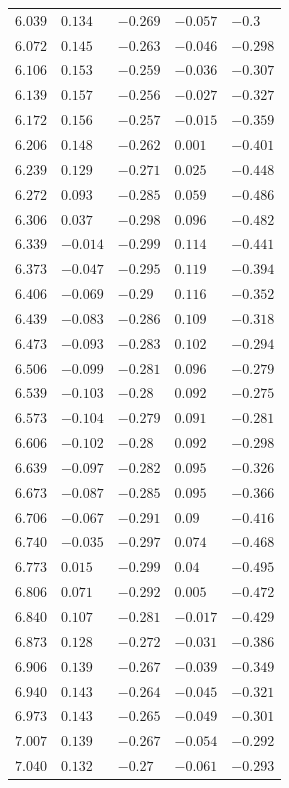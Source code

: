\begin{table}[h]
\begin{tabular}{rllll}
$6.039$&$0.134$&$-0.269$&$-0.057$&$-0.3$\\
$6.072$&$0.145$&$-0.263$&$-0.046$&$-0.298$\\
$6.106$&$0.153$&$-0.259$&$-0.036$&$-0.307$\\
$6.139$&$0.157$&$-0.256$&$-0.027$&$-0.327$\\
$6.172$&$0.156$&$-0.257$&$-0.015$&$-0.359$\\
$6.206$&$0.148$&$-0.262$&$0.001$&$-0.401$\\
$6.239$&$0.129$&$-0.271$&$0.025$&$-0.448$\\
$6.272$&$0.093$&$-0.285$&$0.059$&$-0.486$\\
$6.306$&$0.037$&$-0.298$&$0.096$&$-0.482$\\
$6.339$&$-0.014$&$-0.299$&$0.114$&$-0.441$\\
$6.373$&$-0.047$&$-0.295$&$0.119$&$-0.394$\\
$6.406$&$-0.069$&$-0.29$&$0.116$&$-0.352$\\
$6.439$&$-0.083$&$-0.286$&$0.109$&$-0.318$\\
$6.473$&$-0.093$&$-0.283$&$0.102$&$-0.294$\\
$6.506$&$-0.099$&$-0.281$&$0.096$&$-0.279$\\
$6.539$&$-0.103$&$-0.28$&$0.092$&$-0.275$\\
$6.573$&$-0.104$&$-0.279$&$0.091$&$-0.281$\\
$6.606$&$-0.102$&$-0.28$&$0.092$&$-0.298$\\
$6.639$&$-0.097$&$-0.282$&$0.095$&$-0.326$\\
$6.673$&$-0.087$&$-0.285$&$0.095$&$-0.366$\\
$6.706$&$-0.067$&$-0.291$&$0.09$&$-0.416$\\
$6.740$&$-0.035$&$-0.297$&$0.074$&$-0.468$\\
$6.773$&$0.015$&$-0.299$&$0.04$&$-0.495$\\
$6.806$&$0.071$&$-0.292$&$0.005$&$-0.472$\\
$6.840$&$0.107$&$-0.281$&$-0.017$&$-0.429$\\
$6.873$&$0.128$&$-0.272$&$-0.031$&$-0.386$\\
$6.906$&$0.139$&$-0.267$&$-0.039$&$-0.349$\\
$6.940$&$0.143$&$-0.264$&$-0.045$&$-0.321$\\
$6.973$&$0.143$&$-0.265$&$-0.049$&$-0.301$\\
$7.007$&$0.139$&$-0.267$&$-0.054$&$-0.292$\\
$7.040$&$0.132$&$-0.27$&$-0.061$&$-0.293$\\

\end{tabular}
\end{table}
